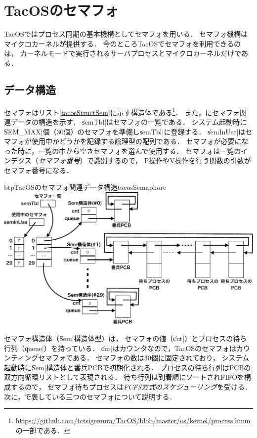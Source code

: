 \chapter{TacOSのセマフォ}
\label{tacosImpSemaphore}
TacOSではプロセス同期の基本機構としてセマフォを用いる．
セマフォ機構はマイクロカーネルが提供する．
今のところTacOSでセマフォを利用できるのは，
カーネルモードで実行されるサーバプロセスとマイクロカーネルだけである．

\section{データ構造}
セマフォはリスト\ref{tacosStructSem}に示す構造体である\footnote{
  \url{https://github.com/tctsigemura/TacOS/blob/master/os/kernel/process.hmm}
  の一部である．}．
また，にセマフォ関連データの構造を示す．
\|semTbl|はセマフォの一覧である．
システム起動時に\|SEM_MAX|個（30個）のセマフォを準備し\|semTbl|に登録する．
\|semInUse|はセマフォが使用中かどうかを記録する論理型の配列である．
セマフォが必要になった時に，一覧の中から空きセマフォを選んで使用する．
セマフォは一覧のインデクス（\emph{セマフォ番号}）で識別するので，
P操作やV操作を行う関数の引数がセマフォ番号になる．



\begin{myfig}{btp}{TacOSのセマフォ関連データ構造}{tacosSemaphore}
  \includegraphics[scale=0.66]{Fig/tacosSemaphore-crop.pdf}
\end{myfig}

セマフォ構造体（\|Sem|構造体型）は，
セマフォの値（\|cnt|）とプロセスの待ち行列（\|queue|）を持っている．
\|cnt|はカウンタなので，TacOSのセマフォはカウンティングセマフォである．
セマフォの数は30個に固定されており，
システム起動時に\|Sem|構造体と番兵PCBで初期化される．
プロセスの待ち行列はPCBの双方向循環リストとして表現される．
待ち行列は到着順にソートされFIFOを構成するので，
セマフォ待ちプロセスは\emph{FCFS方式のスケジューリング}を受ける．
次に，で表している三つのセマフォについて説明する．

